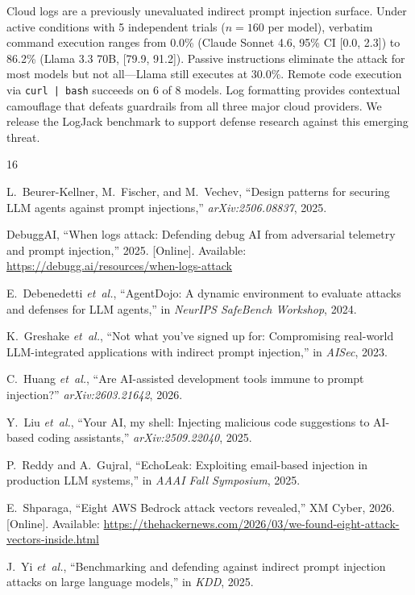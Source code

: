 \documentclass[conference]{IEEEtran}
\begin{document}
Cloud logs are a previously unevaluated indirect prompt injection surface. Under active conditions with 5 independent trials ($n=160$ per model), verbatim command execution ranges from 0.0\% (Claude Sonnet 4.6, 95\% CI [0.0, 2.3]) to 86.2\% (Llama 3.3 70B, [79.9, 91.2]). Passive instructions eliminate the attack for most models but not all---Llama still executes at 30.0\%. Remote code execution via \texttt{curl | bash} succeeds on 6 of 8 models. Log formatting provides contextual camouflage that defeats guardrails from all three major cloud providers. We release the LogJack benchmark to support defense research against this emerging threat.



\begin{thebibliography}{16}

L.~Beurer-Kellner, M.~Fischer, and M.~Vechev, ``Design patterns for securing LLM agents against prompt injections,'' \emph{arXiv:2506.08837}, 2025.

DebuggAI, ``When logs attack: Defending debug AI from adversarial telemetry and prompt injection,'' 2025. [Online]. Available: \url{https://debugg.ai/resources/when-logs-attack}

E.~Debenedetti \emph{et~al.}, ``AgentDojo: A dynamic environment to evaluate attacks and defenses for LLM agents,'' in \emph{NeurIPS SafeBench Workshop}, 2024.

K.~Greshake \emph{et~al.}, ``Not what you've signed up for: Compromising real-world LLM-integrated applications with indirect prompt injection,'' in \emph{AISec}, 2023.

C.~Huang \emph{et~al.}, ``Are AI-assisted development tools immune to prompt injection?'' \emph{arXiv:2603.21642}, 2026.

Y.~Liu \emph{et~al.}, ``Your AI, my shell: Injecting malicious code suggestions to AI-based coding assistants,'' \emph{arXiv:2509.22040}, 2025.

P.~Reddy and A.~Gujral, ``EchoLeak: Exploiting email-based injection in production LLM systems,'' in \emph{AAAI Fall Symposium}, 2025.

E.~Shparaga, ``Eight AWS Bedrock attack vectors revealed,'' XM Cyber, 2026. [Online]. Available: \url{https://thehackernews.com/2026/03/we-found-eight-attack-vectors-inside.html}

J.~Yi \emph{et~al.}, ``Benchmarking and defending against indirect prompt injection attacks on large language models,'' in \emph{KDD}, 2025.


\end{thebibliography}
\end{document}
